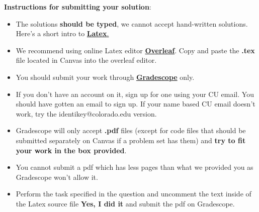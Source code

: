 \documentclass[12pt]{article}
\begin{document}
\renewcommand{\headrulewidth}{0.5pt}

\phantom{Test}

\begin{small}


\textbf{Instructions for submitting your solution}:
\vspace{-5mm} 

\begin{itemize}
	\item The solutions \textbf{should be typed}, we cannot accept hand-written solutions. Here's a short intro to \href{http://ece.uprm.edu/~caceros/latex/introduction.pdf}{\textbf{Latex}.}
	\item We recommend using online Latex editor \href{https://www.overleaf.com/}{\textbf{Overleaf}}. Copy and paste the \textbf{.tex} file located in Canvas into the overleaf editor.
	\item You should submit your work through \href{https://www.gradescope.com}{\textbf{Gradescope}}  only.
	\item If you don't have an account on it, sign up for one using your CU email. You should have gotten an email to sign up. If your name based CU email doesn't work, try the identikey@colorado.edu version. 
	\item Gradescope will only accept \textbf{.pdf} files (except for code files that should be submitted separately on Canvas if a problem set has them) and \textbf{try to fit your work in the box provided}. 
	\item You cannot submit a pdf which has less pages than what we provided you as Gradescope won't allow it.
    \item Perform the task specified in the question and uncomment the text inside of the Latex source file \textbf{Yes, I did it} and submit the pdf on Gradescope.
\end{itemize}
\vspace{-4mm} 
\end{small}
\end{document}
